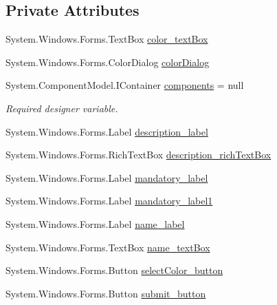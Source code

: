 \subsection*{Private Attributes}
\begin{DoxyCompactItemize}
\item 
System.\+Windows.\+Forms.\+Text\+Box \hyperlink{classWildlifeTrackingApp_1_1AddCategory_af32de17dc2e977c753051e4fda44cba1}{color\+\_\+text\+Box}
\item 
System.\+Windows.\+Forms.\+Color\+Dialog \hyperlink{classWildlifeTrackingApp_1_1AddCategory_af5ea1053a29b769cb6970f4f987b6fc1}{color\+Dialog}
\item 
System.\+Component\+Model.\+I\+Container \hyperlink{classWildlifeTrackingApp_1_1AddCategory_a02595f1c09713bb71dcb2fbbfc7ffa4b}{components} = null
\begin{DoxyCompactList}\small\item\em Required designer variable. \end{DoxyCompactList}\item 
System.\+Windows.\+Forms.\+Label \hyperlink{classWildlifeTrackingApp_1_1AddCategory_a5a1799944a6da4432adf81c9403918ed}{description\+\_\+label}
\item 
System.\+Windows.\+Forms.\+Rich\+Text\+Box \hyperlink{classWildlifeTrackingApp_1_1AddCategory_a0760a97883bbcc1aa4ef20db02c81505}{description\+\_\+rich\+Text\+Box}
\item 
System.\+Windows.\+Forms.\+Label \hyperlink{classWildlifeTrackingApp_1_1AddCategory_aa4d0e09997f0ef76f00a520b0b8228c2}{mandatory\+\_\+label}
\item 
System.\+Windows.\+Forms.\+Label \hyperlink{classWildlifeTrackingApp_1_1AddCategory_a8d0d54f782d0abb2f21bab81d8c21dd9}{mandatory\+\_\+label1}
\item 
System.\+Windows.\+Forms.\+Label \hyperlink{classWildlifeTrackingApp_1_1AddCategory_af6ba70393d92ce2a983bf47ab956b019}{name\+\_\+label}
\item 
System.\+Windows.\+Forms.\+Text\+Box \hyperlink{classWildlifeTrackingApp_1_1AddCategory_aa359962ce074ab9473880842aecc6353}{name\+\_\+text\+Box}
\item 
System.\+Windows.\+Forms.\+Button \hyperlink{classWildlifeTrackingApp_1_1AddCategory_ab9917c7bafb007d23c574c8d7d1049ac}{select\+Color\+\_\+button}
\item 
System.\+Windows.\+Forms.\+Button \hyperlink{classWildlifeTrackingApp_1_1AddCategory_a6c7fe113bfa091362451d2814c3c108a}{submit\+\_\+button}
\end{DoxyCompactItemize}
